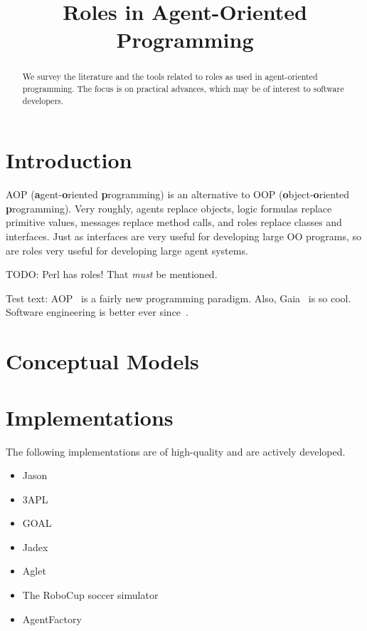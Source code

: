 \documentclass{article}
\title{Roles in Agent-Oriented Programming}
\newcommand{\fb}[1]{\textbf{#1}}
\begin{document}
\maketitle
\begin{abstract}
We survey the literature and the tools related to roles as used in agent-oriented programming.
The focus is on practical advances, which may be of interest to software developers.
\end{abstract}

\section{Introduction}

AOP (\fb agent-\fb oriented \fb programming) is an alternative to OOP (\fb object-\fb oriented \fb programming).
Very roughly, agents replace objects, logic formulas replace primitive values, messages replace method calls, and roles replace classes and interfaces.
Just as interfaces are very useful for developing large OO programs, so are roles very useful for developing large agent systems.

TODO: Perl has roles! That \emph{must} be mentioned.


Test text:
AOP~\cite{journals/ai/Shoham93} is a fairly new programming paradigm.
Also, Gaia~\cite{journals/aamas/WooldridgeJK00} is so cool.
Software engineering is better ever since~\cite{conf/aose/WooldridgeC00}.

\section{Conceptual Models}

\section{Implementations}

The following implementations are of high-quality and are actively developed.
\begin{itemize}
\item Jason~\cite{books/sp/map2005/BordiniHV05}
\item 3APL~\cite{books/sp/map2005/DastaniRM05}
\item GOAL~\cite{hindriks2009programmingrationalagents}
\item Jadex~\cite{todo}
\item Aglet~\cite{todo}
\item The RoboCup soccer simulator
\item AgentFactory
\end{itemize}
\end{document}
